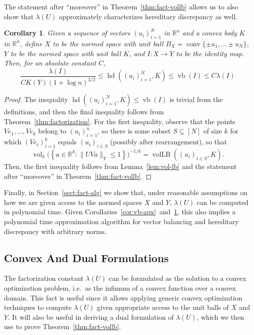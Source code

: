 \documentclass[11pt]{article}
\newtheorem{corollary}[theorem]{Corollary}
\newcommand{\R}{{\mathbb{R}}}
\newcommand{\set}[1]{\left\{ #1 \right\}}
\DeclareMathOperator{\vollb}{volLB}
\DeclareMathOperator{\hd}{hd}
\DeclareMathOperator{\vb}{vb}
\DeclareMathOperator{\vol}{vol}
\DeclareMathOperator{\conv}{conv}
\begin{document}
The statement after ``moreover'' in Theorem~\ref{thm:fact-vollb}
allows us to also show that $\lambda(U)$ approximately characterizes
hereditary discrepancy as well.
\begin{corollary}\label{cor:hd-apx}
  Given a sequence of vectors $(u_i)_{i = 1}^N$ in $\R^n$ and a convex
  body $K$ in $\R^n$, define $X$ to be the normed space with
  unit ball $B_X = \conv\{\pm u_1, \ldots \pm u_N\}$, $Y$ to be
  the normed space with unit ball $K$, and $I:X \to Y$ to be the
  identity map. Then, for an absolute constant $C$,
  \[
  \frac{\lambda(I)}{C K(Y) (1 + \log n)^{3/2}} 
  \le \hd((u_i)_{i = 1}^N, K) \le \vb(I) 
  \le C \lambda(I)
  \]
\end{corollary}
\begin{proof}
 The inequality $\hd((u_i)_{i = 1}^N, K) \le \vb(I)$ is trivial from
 the definitions, and then the final inequality follows from
 Theorem~\ref{thm:factorization}. For the first inequality, observe
 that the points $Ve_1, \ldots, Ve_k$ belong to $(u_i)_{i = 1}^n$, so
 there is some subset $S \subseteq [N]$ of size $k$ for which
 $(Ve_i)_{i = 1}^k$ equals $(u_i)_{i \in S}$ (possibly after
 rearrangement), so that 
 \[
 \vol_k\bigl(\set{a \in \R^k: \|UV a\|_Y \le 1}\bigr)^{-1/k} =
 \vollb((u_i)_{i \in S}, K).
 \]
 Then, the first inequality follows from Lemma~\ref{lem:vol-lb} and
 the statement after ``moreover'' in Theorem~\ref{thm:fact-vollb}.
\end{proof}

Finally, in Section~\ref{sect:fact-alg} we show that, under reasonable
assumptions on how we are given access to the normed spaces $X$ and
$Y$, $\lambda(U)$ can be computed in polynomial time. Given
Corollaries~\ref{cor:vb-apx}~and~\ref{cor:hd-apx}, this also implies a
polynomial time approximation algorithm for vector balancing and
hereditary discrepancy with arbitrary norms. 

\subsection{Convex And Dual Formulations}

The factorization constant $\lambda(U)$ can be formulated as the
solution to a convex optimization problem, i.e.~as the infimum of a
convex function over a convex domain. This fact is useful since it
allows applying generic convex optimization techniques to compute
$\lambda(U)$ given appropriate access to the unit balls of $X$ and
$Y$. It will also be useful in deriving a dual formulation of
$\lambda(U)$, which we then use to prove Theorem~\ref{thm:fact-vollb}.
\end{document}
